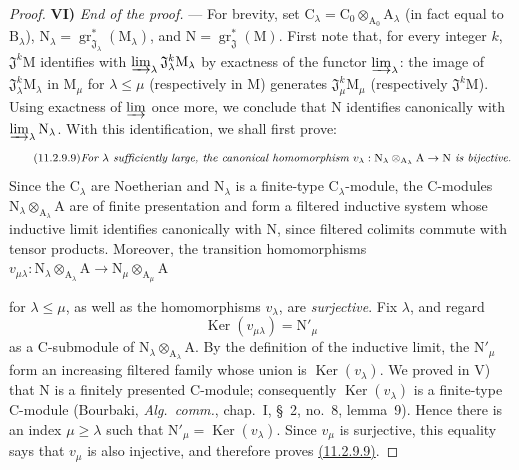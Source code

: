 \begin{proof}
\medskip
\noindent\textbf{VI)} \emph{End of the proof.} --- For brevity, set $\mathrm{C}_\lambda=\mathrm{C}_0\otimes_{\mathrm{A}_0}\mathrm{A}_\lambda$ (in fact equal to $\mathrm{B}_\lambda$), $\mathrm{N}_\lambda=\operatorname{gr}^*_{\mathfrak{J}_\lambda}(\mathrm{M}_\lambda)$, and $\mathrm{N}=\operatorname{gr}^*_\mathfrak{J}(\mathrm{M})$. First note that, for every integer $k$, $\mathfrak{J}^k\mathrm{M}$ identifies with $\varinjlim_\lambda\mathfrak{J}_\lambda^k\mathrm{M}_\lambda$ by exactness of the functor $\varinjlim_\lambda$: the image of $\mathfrak{J}_\lambda^k\mathrm{M}_\lambda$ in $\mathrm{M}_\mu$ for $\lambda\leqslant\mu$ (respectively in $\mathrm{M}$) generates $\mathfrak{J}_\mu^k\mathrm{M}_\mu$ (respectively $\mathfrak{J}^k\mathrm{M}$). Using exactness of $\varinjlim$ once more, we conclude that $\mathrm{N}$ identifies canonically with $\varinjlim_\lambda\mathrm{N}_\lambda$. With this identification, we shall first prove:
\begin{equation}
\tag{11.2.9.9}
\text{\emph{For $\lambda$ sufficiently large, the canonical homomorphism $v_\lambda:\mathrm{N}_\lambda\otimes_{\mathrm{A}_\lambda}\mathrm{A}\to\mathrm{N}$ is bijective.}}
\end{equation}
Since the $\mathrm{C}_\lambda$ are Noetherian and $\mathrm{N}_\lambda$ is a finite-type $\mathrm{C}_\lambda$-module, the $\mathrm{C}$-modules $\mathrm{N}_\lambda\otimes_{\mathrm{A}_\lambda}\mathrm{A}$ are of finite presentation and form a filtered inductive system whose inductive limit identifies canonically with $\mathrm{N}$, since filtered colimits commute with tensor products. Moreover, the transition homomorphisms $v_{\mu\lambda}:\mathrm{N}_\lambda\otimes_{\mathrm{A}_\lambda}\mathrm{A}\to\mathrm{N}_\mu\otimes_{\mathrm{A}_\mu}\mathrm{A}$


for $\lambda\leqslant\mu$, as well as the homomorphisms $v_\lambda$, are
\emph{surjective}. Fix $\lambda$, and regard
\[
  \operatorname{Ker}(v_{\mu\lambda})=\mathrm{N}'_\mu
\]
as a $\mathrm{C}$-submodule of
$\mathrm{N}_\lambda\otimes_{\mathrm{A}_\lambda}\mathrm{A}$. By the
definition of the inductive limit, the $\mathrm{N}'_\mu$ form an
increasing filtered family whose union is $\operatorname{Ker}(v_\lambda)$.
We proved in V) that $\mathrm{N}$ is a finitely presented
$\mathrm{C}$-module; consequently
$\operatorname{Ker}(v_\lambda)$ is a finite-type $\mathrm{C}$-module
(Bourbaki, \emph{Alg.\ comm.}, chap.~I, \S~2, no.~8, lemma~9). Hence
there is an index $\mu\geqslant\lambda$ such that
$\mathrm{N}'_\mu=\operatorname{Ker}(v_\lambda)$. Since $v_\mu$ is
surjective, this equality says that $v_\mu$ is also injective, and
therefore proves \hyperref[IV.11.2.9]{(11.2.9.9)}.


\end{proof}
